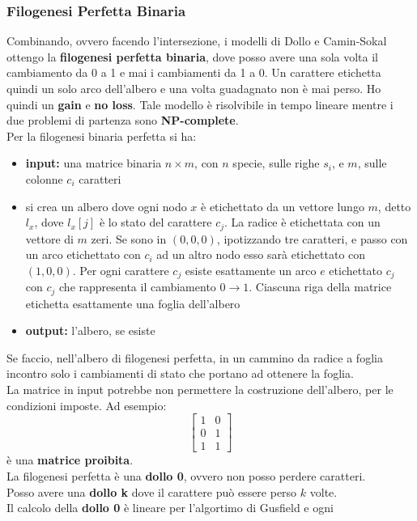 \documentclass[a4paper,12pt, oneside]{book}
\begin{document}
\subsubsection{Filogenesi Perfetta Binaria}
Combinando, ovvero facendo l'intersezione, i modelli di Dollo e Camin-Sokal
ottengo la \textbf{filogenesi 
  perfetta binaria}, dove posso avere una sola volta il cambiamento da 0 a 1 e
mai i cambiamenti da 1 a 0. Un carattere etichetta quindi un solo arco
dell'albero e una volta guadagnato non è mai perso. Ho quindi un \textbf{gain} e
\textbf{no loss}. Tale modello è risolvibile in tempo lineare mentre i due
problemi di partenza sono \textbf{NP-complete}.\\
Per la filogenesi binaria perfetta si ha:
\begin{itemize}
  \item \textbf{input:} una matrice binaria $n\times m$, con $n$ specie, sulle
  righe $s_i$, e $m$, sulle colonne $c_i$
  caratteri
  \item si crea un albero dove ogni nodo $x$ è etichettato da un
  vettore lungo $m$, detto $l_x$, dove $l_x[j]$ è lo stato del carattere
  $c_j$. La radice è etichettata con un vettore di $m$ zeri. Se sono in
  $(0,0,0)$, ipotizzando tre caratteri, e passo con un arco etichettato con
  $c_i$ ad un altro nodo esso sarà etichettato con $(1,0,0)$.
  Per ogni carattere $c_j$ esiste esattamente un arco $e$ etichettato
  $c_j$ con $c_j$ che rappresenta il cambiamento $0\to 1$. Ciascuna riga della
  matrice etichetta esattamente una foglia dell'albero
  \item \textbf{output:} l'albero, se esiste
\end{itemize}
Se faccio, nell'albero di filogenesi perfetta, in un cammino da radice a foglia
incontro solo i cambiamenti di stato che portano ad ottenere la foglia.\\
La matrice in input potrebbe non permettere la costruzione dell'albero, per le
condizioni imposte. Ad esempio:
\[\left[
    \begin{matrix}
      1 & 0\\
      0 & 1\\
      1 & 1
    \end{matrix}
  \right]
\]
è una \textbf{matrice proibita}.\\
La filogenesi perfetta è una \textbf{dollo 0}, ovvero non posso perdere
caratteri. \\
Posso avere una \textbf{dollo k} dove il carattere può essere perso
$k$ volte.\\
Il calcolo della \textbf{dollo 0} è lineare per l'algortimo di Gusfield e ogni
\end{document}
